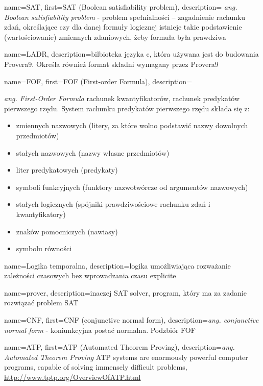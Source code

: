 
 {
    name=SAT,
    first={SAT (Boolean satisfiability problem)},
    description={ \textit{ang. Boolean satisfiability problem} - problem spełnialności – zagadnienie rachunku zdań, określające czy dla danej formuły logicznej istnieje takie podstawienie (wartościowanie) zmiennych zdaniowych, żeby formuła była prawdziwa}
}

 {
    name=LADR,
    description={bilbioteka języka c, która używana jest do budowania Provera9. Określa również format składni wymagany przez Provera9}
}

 {
    name=FOF,
    first={FOF (First-order Formula)},
    description={\textit{ang. First-Order Formula} rachunek kwantyfikatorów, rachunek predykatów pierwszego rzędu. System rachunku predykatów pierwszego rzędu składa się z:
\begin{itemize}
    \item zmiennych nazwowych (litery, za które wolno podstawić nazwy dowolnych przedmiotów)
    \item stałych nazwowych (nazwy własne przedmiotów)
    \item liter predykatowych (predykaty)
    \item symboli funkcyjnych (funktory nazwotwórcze od argumentów nazwowych)
    \item stałych logicznych (spójniki prawdziwościowe rachunku zdań i kwantyfikatory)
    \item znaków pomocniczych (nawiasy)
    \item symbolu równości
\end{itemize}
    }
}

 {
    name={Logika temporalna},
    description={logika umożliwiająca rozważanie zależności czasowych bez wprowadzania czasu explicite}
}

 {
    name=prover,
    description={inaczej SAT solver, program, który ma za zadanie rozwiązać problem SAT}
}

 {
    name=CNF,
    first={CNF (conjunctive normal form)},
    description={\textit{ang. conjunctive normal form} - koniunkcyjna postać normalna. Podzbiór FOF}
}

 {
    name=ATP,
    first={ATP (Automated Theorem Proving)},
    description={\textit{ang. Automated Theorem Proving} ATP systems are enormously powerful computer programs, capable of solving immensely difficult problems, \url{http://www.tptp.org/OverviewOfATP.html}}
}

